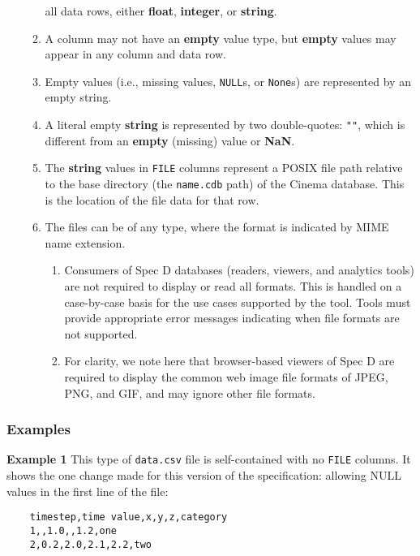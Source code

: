 \begin{enumerate}
\begin{enumerate}
all data rows, either \textbf{float}, \textbf{integer}, or \textbf{string}.
\item A column may not have an \textbf{empty} value type, but \textbf{empty} 
values may appear in any column and data row.%
\item Empty values (i.e., missing values, \texttt{\small NULL}s, or 
\texttt{\small None}s) are represented by an empty string.  
\item A literal empty \textbf{string} is represented by two double-quotes: 
\texttt{""}, which is different from an \textbf{empty} (missing) value or 
\textbf{NaN}. 
\item The \textbf{string} values in \texttt{\small FILE} columns represent
a POSIX file path relative to the base directory (the \texttt{\small name.cdb} 
path) of the Cinema database. This is the location of the file data for that 
row.
\item The files can be of any type, where the format is indicated by MIME name 
extension.
\begin{enumerate}
\item Consumers of Spec D databases (readers, viewers, and analytics tools) 
are not required to display or read all formats. This is handled on a 
case-by-case basis for the use cases supported by the tool. Tools must 
provide appropriate error messages indicating when file formats are not 
supported. 
\item For clarity, we note here that browser-based viewers of Spec D are 
required to display the common web image file formats of JPEG, PNG, and GIF, 
and may ignore other file formats.
\end{enumerate}
\end{enumerate}
\end{enumerate}

\subsubsection{Examples}

\noindent
\textbf{Example 1} This type of \texttt{\small data.csv} file is 
self-contained with no \texttt{\small FILE} columns. It shows the one 
change made for this version of the specification: allowing 
NULL values in the first line of the file:

\begin{verbatim}
    timestep,time value,x,y,z,category
    1,,1.0,,1.2,one
    2,0.2,2.0,2.1,2.2,two
\end{verbatim}


